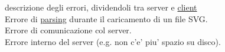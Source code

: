  
descrizione degli errori, dividendoli tra server e \underline{client}\\
Errore di \underline{parsing} durante il caricamento di un file SVG.\\
Errore di comunicazione col server. \\
Errore interno del server (e.g. non c'e' piu' spazio su disco).\\
 

